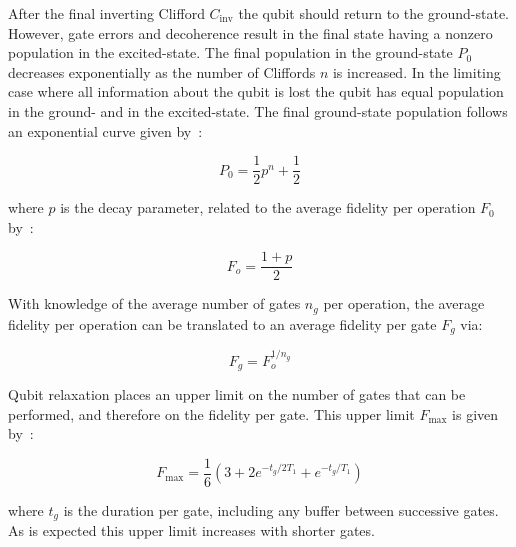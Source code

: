       After the final inverting Clifford $C_\text{inv}$ the qubit should return to the ground-state. However, gate errors and decoherence result in the final state having a nonzero population in the excited-state. The final population in the ground-state $P_0$ decreases exponentially as the number of Cliffords $n$ is increased. In the limiting case where all information about the qubit is lost the qubit has equal population in the ground- and in the excited-state. The final ground-state population follows an exponential curve  given by~\cite{knill2008randomized}:

      \begin{equation}
        P_0= \frac{1}{2} p^n + \frac{1}{2}
        \label{eq:RB exponential decay}
      \end{equation}

      where $p$ is the decay parameter, related to the average fidelity per operation $F_0$ by~\cite{magesan2011scalable}:

      \begin{equation}
        F_o = \frac{1+p}{2}
      \end{equation}

      With knowledge of the average number of gates $n_g$ per operation, the average fidelity per operation can be translated to an average fidelity per gate $F_g$ via:

      \begin{equation}
        F_g = F_o^{1/n_g}
      \end{equation}

      Qubit relaxation places an upper limit on the number of gates that can be performed, and therefore on the fidelity per gate. This upper limit $F_\text{max}$ is given by~\cite{T1_derivation}:

      \begin{equation}
        F_\text{max} = \frac{1}{6}\left(3 + 2 e^{-t_g/2 T_1} + e^{-t_g/T_1}\right)
        \label{eq:RB T1 fidelity limit}
      \end{equation}

      where $t_g$ is the duration per gate, including any buffer between successive gates. As is expected this upper limit increases with shorter gates.

